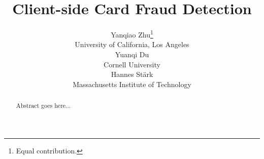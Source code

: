 \documentclass{article}
\title[Sub-title]{Client-side Card Fraud Detection}
\author[Y. Zhu et al.]{%
Yanqiao Zhu\thanks{Equal contribution.}\\
University of California, Los Angeles\\
\email{yzhu@cs.ucla.edu}\And
Yuanqi Du\footnotemark[1]\\
Cornell University\\
\email{yd392@cornell.edu}\And
Hannes Stärk\\
Massachusetts Institute of Technology\\
\email{hstark@mit.edu}
}
\begin{document}
\maketitle

\begin{abstract}
  Abstract goes here...
\end{abstract}
\end{document}
